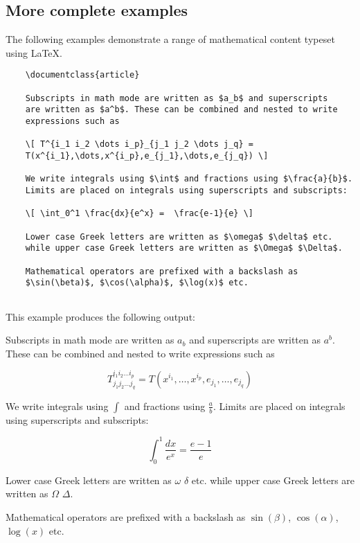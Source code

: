 \subsection{More complete examples}

The following examples demonstrate a range of mathematical content typeset using LaTeX.

\begin{tcolorbox}
\begin{verbatim}
    \documentclass{article}
    
    Subscripts in math mode are written as $a_b$ and superscripts 
    are written as $a^b$. These can be combined and nested to write
    expressions such as

    \[ T^{i_1 i_2 \dots i_p}_{j_1 j_2 \dots j_q} = 
    T(x^{i_1},\dots,x^{i_p},e_{j_1},\dots,e_{j_q}) \]
 
    We write integrals using $\int$ and fractions using $\frac{a}{b}$. 
    Limits are placed on integrals using superscripts and subscripts:

    \[ \int_0^1 \frac{dx}{e^x} =  \frac{e-1}{e} \]

    Lower case Greek letters are written as $\omega$ $\delta$ etc. 
    while upper case Greek letters are written as $\Omega$ $\Delta$.

    Mathematical operators are prefixed with a backslash as
    $\sin(\beta)$, $\cos(\alpha)$, $\log(x)$ etc.
    
\end{verbatim}
\end{tcolorbox}

This example produces the following output:

\begin{mdframed}
    \-\hspace{20pt}Subscripts in math mode are written as $a_b$ and superscripts are written as $a^b$. These can be combined and nested to write expressions such as

    \[ T^{i_1 i_2 \dots i_p}_{j_1 j_2 \dots j_q} = T(x^{i_1},\dots,x^{i_p},e_{j_1},\dots,e_{j_q}) \]
 
    \-\hspace{20pt}We write integrals using $\int$ and fractions using $\frac{a}{b}$. Limits are placed on integrals using superscripts and subscripts:

    \[ \int_0^1 \frac{dx}{e^x} =  \frac{e-1}{e} \]

    \-\hspace{20pt}Lower case Greek letters are written as $\omega$ $\delta$ etc. while upper case Greek letters are written as $\Omega$ $\Delta$.

   \-\hspace{20pt}Mathematical operators are prefixed with a backslash as $\sin(\beta)$, $\cos(\alpha)$, $\log(x)$ etc.
\end{mdframed}

